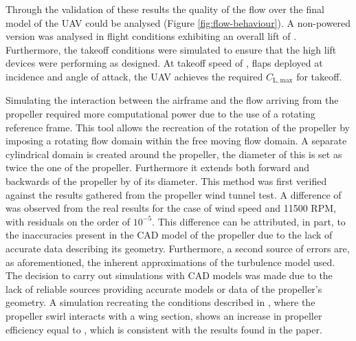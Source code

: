 \documentclass[../../main.tex]{subfiles}
\begin{document}

Through the validation of these results the quality of the flow over the final model of the UAV could be analysed (Figure \ref{fig:flow-behaviour}).
A non-powered version was analysed in flight conditions exhibiting an overall lift of .
Furthermore, the takeoff conditions were simulated to ensure that the high lift devices were performing as designed.
At takeoff speed of , flaps deployed at  incidence and  angle of attack, the UAV achieves the required $C_\mathrm{L,max}$ for takeoff. 


Simulating the interaction between the airframe and the flow arriving from the propeller required more computational power due to the use of a rotating reference frame.
This tool allows the recreation of the rotation of the propeller by imposing a rotating flow domain within the free moving flow domain.
A separate cylindrical domain is created around the propeller, the diameter of this is set as twice the one of the propeller.
Furthermore it extends both forward and backwards of the propeller by  of its diameter.
This method was first verified against the results gathered from the propeller wind tunnel test.
A difference of  was observed from the real results for the case of  wind speed and 11500 RPM, with residuals on the order of $10^{-5}$.
This difference can be attributed, in part, to the inaccuracies present in the CAD model of the propeller due to the lack of accurate data describing its geometry.
Furthermore, a second source of errors are, as aforementioned, the inherent approximations of the turbulence model used.
The decision to carry out simulations with CAD models was made due to the lack of reliable sources providing accurate models or data of the propeller's geometry.
A simulation recreating the conditions described in \cite{kroo-86}, where the propeller swirl interacts with a wing section, shows an increase in propeller efficiency equal to , which is consistent with the results found in the paper.

\end{document}
